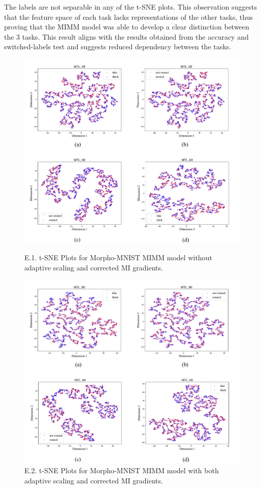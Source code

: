 \documentclass[12pt,DIV14,BCOR12mm,a4paper,footinclude=false,headinclude,parskip=half-,twoside,openright,cleardoublepage=empty,toc=index,bibliography=totoc,listof=totoc]{scrreprt}
\numberwithin{equation}{chapter}
\begin{document}
The labels are not separable in any of the t-SNE plots. This observation suggests that the feature space of each task lacks representations of the other tasks, thus proving that the MIMM model was able to develop a clear distinction between the 3 tasks. This result aligns with the results obtained from the accuracy and switched-labels test and suggests reduced dependency between the tasks.


\begin{figure}[H]
\begin{center}
\includegraphics[width=0.7\linewidth]{thesis/figures/tsne_mmnist_noada_nocorr.pdf}
\caption{E.1. t-SNE Plots for Morpho-MNIST MIMM model without adaptive scaling and corrected MI gradients.}
\includegraphics[width=0.7\linewidth]{thesis/figures/tsne_mmnist_ada_corr.pdf}
\caption{E.2. t-SNE Plots for Morpho-MNIST MIMM model with both adaptive scaling and corrected MI gradients.}
\end{center}
\end{figure}
\end{document}
